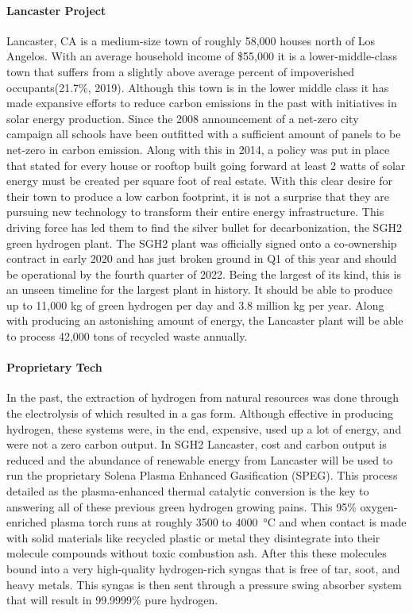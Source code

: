 \documentclass[3p,sort]{elsarticle}
\begin{document}
\paragraph{Lancaster Project} Lancaster, CA is a medium-size town of roughly 58,000 houses north of 
Los Angelos. With an average household income of \$55,000 it is
a lower-middle-class town that suffers from a slightly above average percent of 
impoverished occupants(21.7\%, 2019). 
Although this town is in the lower middle class it has made expansive efforts to 
reduce carbon emissions in the past with initiatives in solar energy production. 
Since the 2008 announcement of a net-zero city campaign all schools have been outfitted 
with a sufficient amount of panels to be net-zero in carbon emission. Along with this
in 2014, a policy was put in place that stated for every house or rooftop built going forward 
at least 2 watts of solar energy must be created per square foot of real estate. With this 
clear desire for their town to produce a low carbon footprint, it is not a surprise that they 
are pursuing new technology to transform their entire energy infrastructure. This driving 
force has led them to find the silver bullet for decarbonization, the SGH2 green hydrogen 
plant. The SGH2 plant was officially signed onto a co-ownership contract in early 2020 and 
has just broken ground in Q1 of this year and should be operational by the fourth quarter of 
2022. Being the largest of its kind, this is an unseen timeline for the largest plant in 
history. It should be able to produce up to 11,000 kg of green hydrogen per day and 3.8 
million kg per year. 
Along with producing an astonishing amount of energy, the Lancaster plant will be able to 
process 42,000 tons of recycled waste annually.

\citep{sgh2, sgh2-ca, sgh2site, solar}

\paragraph{Proprietary Tech} In the past, the extraction of hydrogen from natural resources 
was done through the electrolysis of  which resulted in a gas form. Although effective 
in producing hydrogen, these systems were, in the end, expensive, used up a lot of energy, and 
were not a zero carbon
output. In SGH2 Lancaster, cost and carbon output is reduced and the abundance of renewable 
energy from Lancaster will be used to run the proprietary 
Solena Plasma Enhanced Gasification (SPEG). This process detailed as the plasma-enhanced thermal 
catalytic conversion is the key to answering all of these previous green hydrogen growing pains. 
This 95\% oxygen-enriched plasma torch runs at roughly 3500 to \SI{4000}{\celsius} and when contact 
is made with solid materials like recycled plastic or metal they disintegrate into their molecule 
compounds without toxic combustion ash. After this these molecules bound into a very high-quality 
hydrogen-rich syngas that is free of tar, soot, and heavy metals. This syngas 
is then sent through a pressure swing absorber system that will result in 99.9999\% pure hydrogen. 
\end{document}
